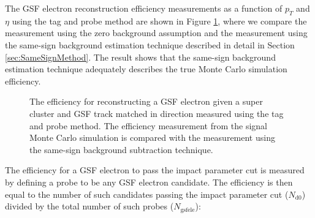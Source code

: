 \documentclass{cmspaper}
\begin{document}
The GSF electron reconstruction efficiency measurements as a function of $p_{T}$ and $\eta$ using the tag and probe method are shown in Figure \ref{gsfElectronEfficiency_TagAndProbe}, where we compare the measurement using the zero background assumption and the measurement using the same-sign background estimation technique described in detail in Section \ref{sec:SameSignMethod}. The result shows that the same-sign background estimation technique adequately describes the true Monte Carlo simulation efficiency.

\begin{figure}[htb]
  \begin{center}
    \caption{The efficiency for reconstructing a GSF electron given a super cluster and GSF track matched in direction measured using the tag and probe method. The efficiency measurement from the signal Monte Carlo simulation is compared with the measurement using the same-sign background subtraction technique.}
    \label{gsfElectronEfficiency_TagAndProbe}
  \end{center}
\end{figure}




The efficiency for a GSF electron to pass the impact parameter cut is measured by defining a probe to be any GSF electron candidate. The efficiency is then equal to the number of such candidates passing the impact parameter cut ($N_{\mathrm{d0}}$) divided by the total number of such probes ($N_{\mathrm{gsfele}}$):
\end{document}
